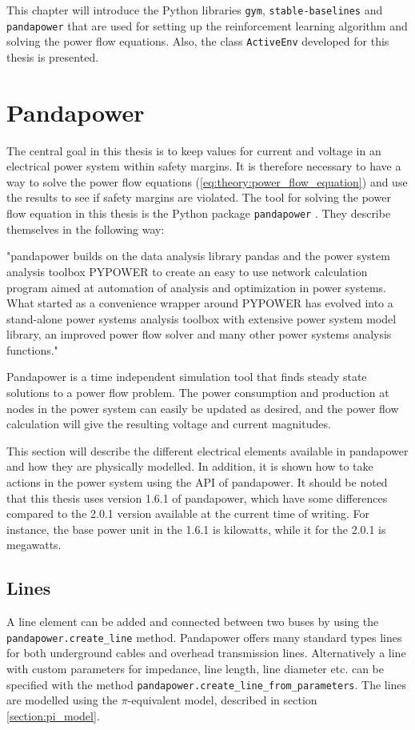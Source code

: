 \documentclass[class=book, crop=false]{standalone}
\begin{document}
This chapter will introduce the Python libraries \texttt{gym}, \texttt{stable-baselines} and \texttt{pandapower} that are used for setting up the reinforcement learning algorithm and solving the power flow equations. Also, the class \texttt{ActiveEnv} developed for this thesis is presented. 


\section{Pandapower}
The central goal in this thesis is to keep values for current and voltage in an electrical power system within safety margins. It is therefore necessary to have a way to solve the power flow equations (\eqref{eq:theory:power_flow_equation}) and use the results to see if safety margins are violated. The tool for solving the power flow equation in this thesis is the Python package \texttt{pandapower} \cite{pandapower}. They describe themselves in the following way:

\begin{displayquote}
"pandapower builds on the data analysis library pandas and the power system analysis toolbox PYPOWER to create an easy to use network calculation program aimed at automation of analysis and optimization in power systems. What started as a convenience wrapper around PYPOWER has evolved into a stand-alone power systems analysis toolbox with extensive power system model library, an improved power flow solver and many other power systems analysis functions." \cite{pandapower_website}
\end{displayquote}

Pandapower is a time independent simulation tool that finds steady state solutions to a power flow problem. The power consumption and production at nodes in the power system can easily be updated as desired, and the power flow calculation will give the resulting voltage and current magnitudes.

This section will describe the different electrical elements available in pandapower and how they are physically modelled. In addition, it is shown how to take actions in the power system using the API of pandapower. It should be noted that this thesis uses version 1.6.1 of pandapower, which have some differences compared to the 2.0.1 version available at the current time of writing. For instance, the base power unit in the 1.6.1 is kilowatts, while it for the 2.0.1 is megawatts.

\subsection*{Lines}
A line element can be added and connected between two buses by using the \texttt{pandapower.create\_line} method. Pandapower offers many standard types lines for both underground cables and overhead transmission lines. Alternatively a line with custom parameters for impedance, line length, line diameter etc. can be specified with the method \texttt{pandapower.create\_line\_from\_parameters}. The lines are modelled using the $\pi$-equivalent model, described in section \ref{section:pi_model}.
\end{document}

